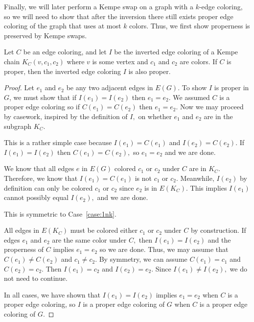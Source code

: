 Finally, we will later perform a Kempe swap on a graph with a $k$-edge coloring, so we will need to show that after the inversion there still exists proper edge coloring of the graph that uses at most $k$ colors. Thus, we first show properness is preserved by Kempe swaps.
\begin{lemma}\label{inverted_proper}
    Let $C$ be an edge coloring, and let $I$ be the inverted edge coloring of a Kempe chain $K_C(v, c_1, c_2)$ where $v$ is some vertex and $c_1$ and $c_2$ are colors. If $C$ is proper, then the inverted edge coloring $I$ is also proper.
\end{lemma}
\begin{proof}
     Let $e_1$ and $e_2$ be any two adjacent edges in $E(G)$. To show $I$ is proper in $G$, we must show that if $I(e_1) = I(e_2)$ then $e_1 = e_2.$ We assumed $C$ is a proper edge coloring so if $C(e_1) = C(e_2)$ then $e_1 = e_2$. Now we may proceed by casework, inspired by the definition of $I,$ on whether $e_1$ and $e_2$ are in the subgraph $K_C.$
     
     This is a rather simple case because $I(e_1) = C(e_1)$ and $I(e_2) = C(e_2).$ If $I(e_1) = I(e_2)$ then $C(e_1) = C(e_2),$ so $e_1 = e_2$ and we are done.

     \label{case:1nk}
     We know that all edges $e$ in $E(G)$ colored $c_1$ or $c_2$ under $C$ are in $K_C.$ Therefore, we know that $I(e_1) = C(e_1)$ is not $c_1$ or $c_2.$ Meanwhile, $I(e_2)$ by definition can only be colored $c_1$ or $c_2$ since $e_2$ is in $E(K_C).$ This implies $I(e_1)$ cannot possibly equal $I(e_2),$ and we are done.
     
     This is symmetric to Case~\ref{case:1nk}.

     All edges in $E(K_C)$ must be colored either $c_1$ or $c_2$ under $C$ by construction. If edges $e_1$ and $e_2$ are the same color under $C,$ then $I(e_1) = I(e_2)$ and the properness of $C$ implies $e_1 = e_2$ so we are done. Thus, we may assume that $C(e_1) \neq C(e_2)$ and $c_1 \neq c_2.$ By symmetry, we can assume $C(e_1) = c_1$ and $C(e_2) = c_2.$ Then $I(e_1) = c_2$ and $I(e_2) = e_2.$ Since $I(e_1) \neq I(e_2),$ we do not need to continue.
     
    In all cases, we have shown that $I(e_1) = I(e_2)$ implies $e_1 = e_2$ when $C$ is a proper edge coloring, so $I$ is a proper edge coloring of $G$ when $C$ is a proper edge coloring of $G$.
\end{proof}

